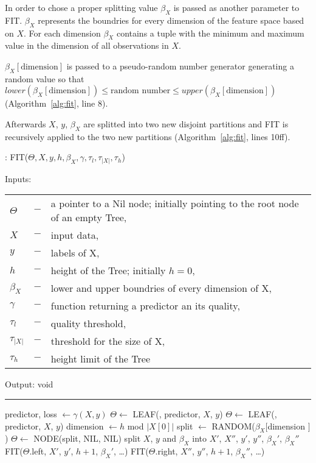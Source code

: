 In order to chose a proper splitting value $\beta_X$ is
passed as another parameter to FIT. $\beta_X$ represents
the boundries for every dimension of the feature space
based on $X$. For each dimension $\beta_X$ contains a
tuple with the minimum and maximum value in the dimension
of all observations in $X$.

$\beta_X[\text{dimension}]$ is passed to a pseudo-random
number generator generating a random value so that
$lower(\beta_X[\text{dimension}]) \leq \text{random number}
\leq upper(\beta_X[\text{dimension}])$
(Algorithm~\ref{alg:fit}, line 8).

Afterwards $X$, $y$, $\beta_X$ are splitted into two new
disjoint partitions and FIT is recursively applied to the
two new partitions (Algorithm~\ref{alg:fit}, lines 10ff).

\begin{algorithm}
  \caption{: FIT($\Theta, X, y, h, \beta_X, \gamma,
    \tau_{l}, \tau_{|X|}, \tau_{h}$)}%
  \label{alg:fit}
  Inputs:

    \begin{tabu}{llX}
    $\Theta$ &$-$ &a pointer to a Nil node; initially
      pointing to the root node of an empty Tree,\\
    $X$ &$-$ &input data,\\
    $y$ &$-$ &labels of X,\\
    $h$ &$-$ &height of the Tree; initially $h = 0$,\\
    $\beta_X$ &$-$ &lower and upper boundries of every
      dimension of X,\\
    $\gamma$ &$-$ &function returning a predictor an its
      quality,\\
    $\tau_{l}$ &$-$ &quality threshold,\\
    $\tau_{|X|}$ &$-$ &threshold for the size of X,\\
    $\tau_{h}$ &$-$ &height limit of the Tree
    \end{tabu}

  Output: void

  \noindent\rule{\linewidth}{0.4pt}

  \begin{algorithmic}[1]
    \STATE predictor, loss $\leftarrow \gamma(X, y)$
      \STATE $\Theta \leftarrow$ LEAF(\TRUE, predictor,
         $X$, $y$)
      \STATE $\Theta \leftarrow$ LEAF(\FALSE, predictor,
        $X$, $y$)
    \ELSE
      \STATE dimension $\leftarrow h$ mod $|X[0]|$
      \STATE split $\leftarrow$ RANDOM($\beta_X[$dimension
        $]$)
      \STATE $\Theta \leftarrow$ NODE(split, NIL, NIL)
      \STATE split $X$, $y$ and $\beta_X$ into
        $X'$, $X''$, $y'$, $y''$, $\beta_X'$, $\beta_X''$
      \STATE FIT($\Theta$.left, $X'$, $y'$, $h + 1$,
        $\beta_X'$, \dots)
      \STATE FIT($\Theta$.right, $X''$, $y''$, $h + 1$,
        $\beta_X''$, \dots)
    \ENDIF
  \end{algorithmic}
\end{algorithm}

